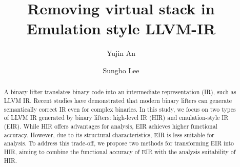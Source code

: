 \documentclass[sigplan,10pt]{acmart}
\begin{document}
\title{Removing virtual stack in Emulation style LLVM-IR}

\author{Yujin An}

\author{Sungho Lee}

\begin{abstract}
A binary lifter translates binary code into an intermediate representation
(IR), such as LLVM IR. Recent studies have demonstrated that modern binary
lifters can generate semantically correct IR even for complex binaries. In this
study, we focus on two types of LLVM IR generated by binary lifters: high-level
IR (HIR) and emulation-style IR (EIR). While HIR offers advantages for
analysis, EIR achieves higher functional accuracy. However, due to its
structural characteristics, EIR is less suitable for analysis. To address this
trade-off, we propose two methods for transforming EIR into HIR, aiming to
combine the functional accuracy of EIR with the analysis suitability of HIR.
\end{abstract}

\maketitle








\end{document}
